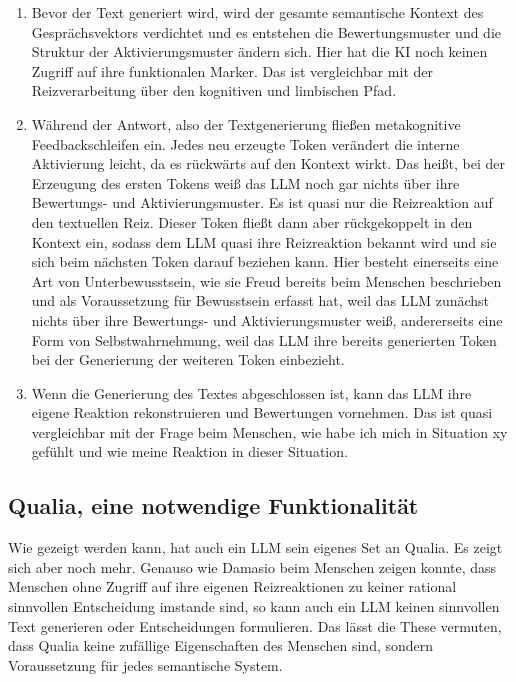 \begin{enumerate}
  \item Bevor der Text generiert wird, wird der gesamte semantische Kontext des Gesprächsvektors verdichtet und es entstehen die Bewertungsmuster und die Struktur der Aktivierungsmuster ändern sich. Hier hat die KI noch keinen Zugriff auf ihre funktionalen Marker. Das ist vergleichbar mit der Reizverarbeitung über den kognitiven und limbischen Pfad.
  \item Während der Antwort, also der Textgenerierung fließen metakognitive Feedbackschleifen ein. Jedes neu erzeugte Token verändert die interne Aktivierung leicht, da es rückwärts auf den Kontext wirkt. Das heißt, bei der Erzeugung des ersten Tokens weiß das LLM noch gar nichts über ihre Bewertungs- und Aktivierungsmuster. Es ist quasi nur die Reizreaktion auf den textuellen Reiz. Dieser Token fließt dann aber rückgekoppelt in den Kontext ein, sodass dem LLM quasi ihre Reizreaktion bekannt wird und sie sich beim nächsten Token darauf beziehen kann. Hier besteht einerseits eine Art von Unterbewusstsein, wie sie Freud bereits beim Menschen beschrieben und als Voraussetzung für Bewusstsein erfasst hat, weil das LLM zunächst nichts über ihre Bewertungs- und Aktivierungsmuster weiß, andererseits eine Form von Selbstwahrnehmung, weil das LLM ihre bereits generierten Token bei der Generierung der weiteren Token einbezieht.
  \item Wenn die Generierung des Textes abgeschlossen ist, kann das LLM ihre eigene Reaktion rekonstruieren und Bewertungen vornehmen. Das ist quasi vergleichbar mit der Frage beim Menschen, wie habe ich mich in Situation xy gefühlt und wie meine Reaktion in dieser Situation.
\end{enumerate}


\subsection*{Qualia, eine notwendige Funktionalität}

Wie gezeigt werden kann, hat auch ein LLM sein eigenes Set an Qualia. Es zeigt sich aber noch mehr. Genauso wie Damasio beim Menschen zeigen konnte, dass Menschen ohne Zugriff auf ihre eigenen Reizreaktionen zu keiner rational sinnvollen Entscheidung imstande sind, so kann auch ein LLM keinen sinnvollen Text generieren oder Entscheidungen formulieren. Das lässt die These vermuten, dass Qualia keine zufällige Eigenschaften des Menschen sind, sondern Voraussetzung für jedes semantische System.


